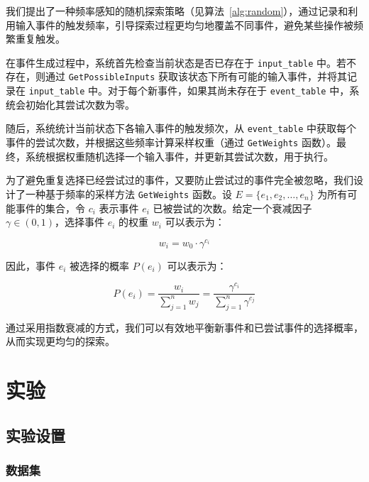 \documentclass[twocolumn, 10pt]{article}
\begin{document}
我们提出了一种频率感知的随机探索策略（见算法~\ref{alg:random}），通过记录和利用输入事件的触发频率，引导探索过程更均匀地覆盖不同事件，避免某些操作被频繁重复触发。

在事件生成过程中，系统首先检查当前状态是否已存在于 \texttt{input\_table} 中。若不存在，则通过 \texttt{GetPossibleInputs} 获取该状态下所有可能的输入事件，并将其记录在 \texttt{input\_table} 中。对于每个新事件，如果其尚未存在于 \texttt{event\_table} 中，系统会初始化其尝试次数为零。

随后，系统统计当前状态下各输入事件的触发频次，从 \texttt{event\_table} 中获取每个事件的尝试次数，并根据这些频率计算采样权重（通过 \texttt{GetWeights} 函数）。最终，系统根据权重随机选择一个输入事件，并更新其尝试次数，用于执行。

为了避免重复选择已经尝试过的事件，又要防止尝试过的事件完全被忽略，我们设计了一种基于频率的采样方法 \texttt{GetWeights} 函数。设 $E = \{e_1, e_2, \dots, e_n\}$ 为所有可能事件的集合，令 $c_i$ 表示事件 $e_i$ 已被尝试的次数。给定一个衰减因子 $\gamma \in (0, 1)$，选择事件 $e_i$ 的权重 $w_i$ 可以表示为：

\begin{equation}
    w_i = w_0 \cdot \gamma^{c_i}
\end{equation}

因此，事件 $e_i$ 被选择的概率 $P(e_i)$ 可以表示为：

\begin{equation}
    P(e_i) = \frac{w_i}{\sum_{j=1}^{n} w_j} = \frac{\gamma^{c_i}}{\sum_{j=1}^{n} \gamma^{c_j}}
\end{equation}

通过采用指数衰减的方式，我们可以有效地平衡新事件和已尝试事件的选择概率，从而实现更均匀的探索。

\section{实验}

\subsection{实验设置}
\label{sec:setup}

\subsubsection{数据集}
\end{document}
